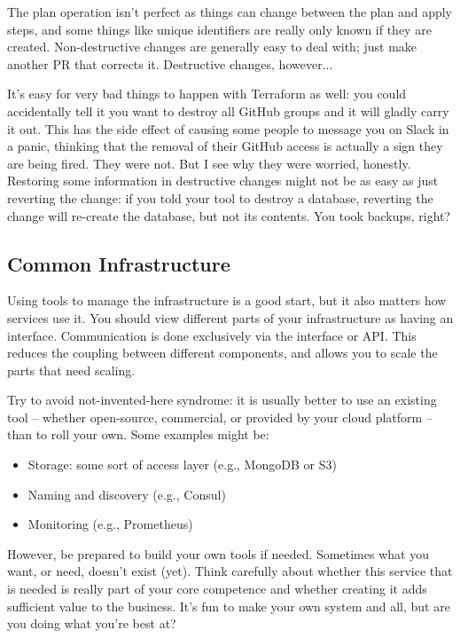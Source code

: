 The plan operation isn't perfect as things can change between the plan and apply steps, and some things like unique identifiers are really only known if they are created. Non-destructive changes are generally easy to deal with; just make another PR that corrects it. Destructive changes, however...

It's easy for very bad things to happen with Terraform as well: you could accidentally tell it you want to destroy all GitHub groups and it will gladly carry it out. This has the side effect of causing some people to message you on Slack in a panic, thinking that the removal of their GitHub access is actually a sign they are being fired. They were not. But I see why they were worried, honestly. Restoring some information in destructive changes might not be as easy as just reverting the change: if you told your tool to destroy a database, reverting the change will re-create the database, but not its contents. You took backups, right?

\subsection*{Common Infrastructure}
Using tools to manage the infrastructure is a good start, but it also matters how services use it. You should view different parts of your infrastructure as having an interface. Communication is done exclusively via the interface or API. This reduces the coupling between different components, and allows you to scale the parts that need scaling. 

Try to avoid not-invented-here syndrome: it is usually better to use an existing tool -- whether open-source, commercial, or provided by your cloud platform -- than to roll your own. Some examples might be:
\begin{itemize}[noitemsep]
\item Storage: some sort of access layer (e.g., MongoDB or S3)
\item Naming and discovery (e.g., Consul)
\item Monitoring (e.g., Prometheus)
\end{itemize}

However, be prepared to build your own tools if needed. Sometimes what you want, or need, doesn't exist (yet). Think carefully about whether this service that is needed is really part of your core competence and whether creating it adds sufficient value to the business. It's fun to make your own system and all, but are you doing what you're best at? 

